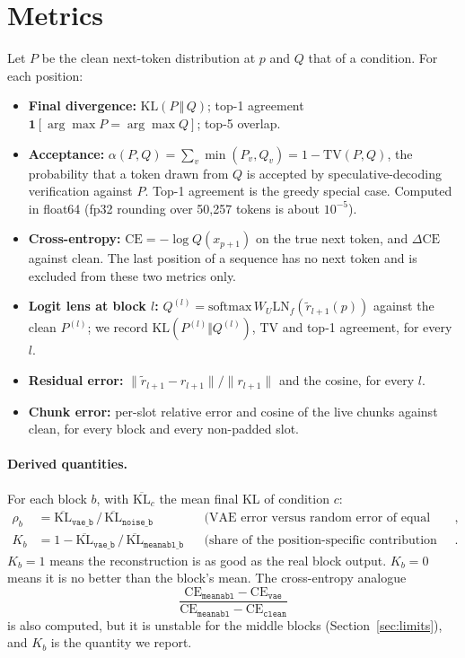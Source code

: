 \documentclass[11pt]{article}
\newcommand{\KL}{\mathrm{KL}}
\newcommand{\TV}{\mathrm{TV}}
\newcommand{\LN}{\mathrm{LN}}
\begin{document}
\section{Metrics}

Let $P$ be the clean next-token distribution at $p$ and $Q$ that of a condition. For each position:
\begin{itemize}
  \item \textbf{Final divergence:} $\KL(P \,\Vert\, Q)$; top-1 agreement $\mathbf{1}[\arg\max P = \arg\max Q]$; top-5
    overlap.
  \item \textbf{Acceptance:} $\alpha(P, Q) = \sum_v \min(P_v, Q_v) = 1 - \TV(P, Q)$, the probability that a token drawn
    from $Q$ is accepted by speculative-decoding verification against $P$. Top-1 agreement is the greedy special case.
    Computed in float64 (fp32 rounding over 50{,}257 tokens is about $10^{-5}$).
  \item \textbf{Cross-entropy:} $\mathrm{CE} = -\log Q(x_{p+1})$ on the true next token, and $\Delta\mathrm{CE}$ against
    clean. The last position of a sequence has no next token and is excluded from these two metrics only.
  \item \textbf{Logit lens at block $l$:} $Q^{(l)} = \mathrm{softmax}\,W_U \LN_f(\tilde r_{l+1}(p))$ against the clean
    $P^{(l)}$; we record $\KL(P^{(l)} \Vert Q^{(l)})$, $\TV$ and top-1 agreement, for every $l$.
  \item \textbf{Residual error:} $\lVert \tilde r_{l+1} - r_{l+1} \rVert / \lVert r_{l+1} \rVert$ and the cosine, for
    every $l$.
  \item \textbf{Chunk error:} per-slot relative error and cosine of the live chunks against clean, for every block and
    every non-padded slot.
\end{itemize}

\paragraph{Derived quantities.} For each block $b$, with $\overline{\KL}_c$ the mean final KL of condition $c$:
\begin{align}
  \rho_b &= \overline{\KL}_{\texttt{vae\_b}} \,/\, \overline{\KL}_{\texttt{noise\_b}}
     && \text{(VAE error versus random error of equal size)},\\
  K_b &= 1 - \overline{\KL}_{\texttt{vae\_b}} \,/\, \overline{\KL}_{\texttt{meanabl\_b}}
     && \text{(share of the position-specific contribution kept)}.
\end{align}
$K_b = 1$ means the reconstruction is as good as the real block output. $K_b = 0$ means it is no better than the block's
mean. The cross-entropy analogue
\begin{equation*}
  \frac{\mathrm{CE}_{\texttt{meanabl}} - \mathrm{CE}_{\texttt{vae}}}{\mathrm{CE}_{\texttt{meanabl}} - \mathrm{CE}_{\texttt{clean}}}
\end{equation*}
is also computed, but it is unstable for the middle blocks (Section~\ref{sec:limits}), and $K_b$ is the quantity we report.
\end{document}

